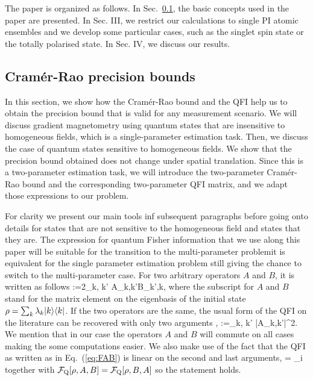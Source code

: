 The paper is organized as follows. In Sec.~\ref{sec:cramer-rao bounds}, the
basic concepts used in the paper are presented.
In Sec. III, we restrict our calculations to single PI atomic ensembles and we
develop some particular cases, such as the singlet spin state
or the totally polarised state. In Sec. IV, we discuss our results.

\subsection{Cram\'er-Rao precision bounds}
\label{sec:cramer-rao bounds}

In this section, we show how the Cram\'er-Rao bound and the QFI help us to obtain the precision bound that is valid for any measurement scenario.
We will discuss gradient magnetometry using quantum states that are insensitive to homogeneous fields, which is a single-parameter estimation task.
Then, we discuss the case of quantum states sensitive to homogeneous fields.
We show that the precision bound obtained does not change under spatial translation.
Since this is a two-parameter estimation task, we will introduce the two-parameter Cram\'er-Rao bound and the corresponding two-parameter QFI matrix, and we adapt those expressions to our problem.

For clarity we present our main tools inf subsequent paragraphs before going onto details for states that are not sensitive to the homogeneous field and states that they are.
The expression for quantum Fisher information that we use along this paper will be suitable for the transition to the multi-parameter problem\ie it is equivalent for the single parameter estimation problem still giving the chance to switch to the multi-parameter case.
For two arbitrary operators $A$ and $B$, it is written as follows
\be
  \label{eq:FAB}
  \qfi[\rho,A,B]:=2\sum_{k, k'}
  {A}_{k,k'}{B}_{k',k},
\ee
where the subscript for $A$ and $B$ stand for the matrix element on the eigenbasis of the initial state $\rho = \sum_k\lambda_k\vert k \rangle\langle k \vert$.
If the two operators are the same, the usual form of the QFI on the literature can be recovered with only two arguments \cite{Paris2009,Braunstein1994,Holevo1982,Helstrom1976,Petz2002,Petz2008},
\be
  \qfi[\rho,A,A]:=\sum_{k, k'}
  |{A}_{k,k'}|^2.
\ee
We mention that in our case the operators $A$ and $B$ will commute on all cases making the some computations easier.
We also make use of the fact that the QFI as written as in Eq.~(\ref{eq:FAB}) is linear on the second and last arguments,
\be
  \label{eq:qfi-linear-in-arguments}
   = \sum_i \qfi[\rho,A,b_i]
\ee
together with $\mathcal{F}_{\text{Q}}[\rho, A, B] = \mathcal{F}_{\text{Q}}[\rho, B,A]$ so the statement holds.

